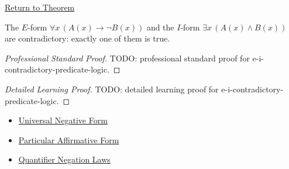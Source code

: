 \newpage
{}
\label{prf:e-i-contradictory-predicate-logic}

\begin{remark*}[Return]
\hyperref[prop:e-i-contradictory-predicate-logic]{Return to Theorem}
\end{remark*}

\begin{theorem*}[E-I Contradiction]
The \(E\)-form \(\forall x\,(A(x)\to \neg B(x))\) and the \(I\)-form
\(\exists x\,(A(x)\land B(x))\) are contradictory: exactly one of them is true.
\end{theorem*}

\begin{proof}[Professional Standard Proof]
\LRAProofBodyStart
TODO: professional standard proof for e-i-contradictory-predicate-logic.
\end{proof}

\begin{proof}[Detailed Learning Proof]
\LRAProofBodyStart
TODO: detailed learning proof for e-i-contradictory-predicate-logic.
\end{proof}

\begin{remark*}
\end{remark*}

\begin{dependencies}
\begin{itemize}
  \item \hyperref[def:categorical-e-form-predicate-logic]{Universal Negative Form}
  \item \hyperref[def:categorical-i-form-predicate-logic]{Particular Affirmative Form}
  \item \hyperref[thm:qneg]{Quantifier Negation Laws}
\end{itemize}
\end{dependencies}

\clearpage
